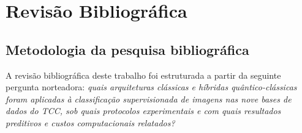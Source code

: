 \documentclass[
    12pt,
    openright,
    oneside,
    a4paper,
    english,
    brazil
]{abntex2}
\begin{document}
\chapter{Revisão Bibliográfica}

\section{Metodologia da pesquisa bibliográfica}

A revisão bibliográfica deste trabalho foi estruturada a partir da seguinte pergunta norteadora: \textit{quais arquiteturas clássicas e híbridas quântico-clássicas foram aplicadas à classificação supervisionada de imagens nas nove bases de dados do TCC, sob quais protocolos experimentais e com quais resultados preditivos e custos computacionais relatados?}
\end{document}
